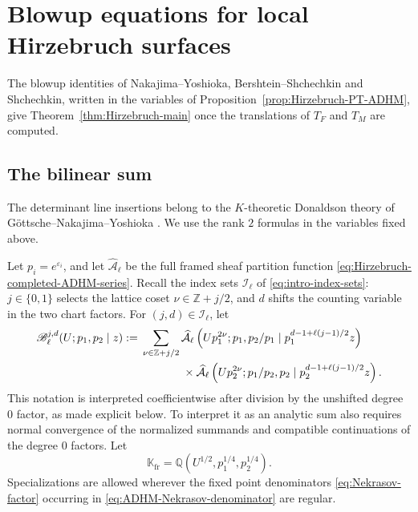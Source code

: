 \documentclass{amsart}
\theoremstyle{definition}
\numberwithin{equation}{section}
\newcommand{\Q}{\mathbb Q}
\newcommand{\Z}{\mathbb Z}
\newcommand{\K}{\mathbb K}
\newcommand{\eps}{\varepsilon}
\begin{document}
\section{Blowup equations for local Hirzebruch surfaces}
\label{sec:NY}

The blowup identities of Nakajima--Yoshioka, Bershtein--Shchechkin and Shchechkin, written in the variables of Proposition~\ref{prop:Hirzebruch-PT-ADHM}, give Theorem~\ref{thm:Hirzebruch-main} once the translations of \(T_F\) and \(T_M\) are computed.

\subsection{The bilinear sum}
The determinant line insertions belong to the \(K\)-theoretic Donaldson theory of G\"ottsche--Nakajima--Yoshioka \cite{GottscheNakajimaYoshioka}.  We use the rank \(2\) formulas in the variables fixed above.

Let \(p_i=e^{\eps_i}\), and let \(\widehat{\mathcal A}_\ell\) be the full framed sheaf partition function \eqref{eq:Hirzebruch-completed-ADHM-series}.  Recall the index sets \(\mathcal I_\ell\) of \eqref{eq:intro-index-sets}: \(j\in\{0,1\}\) selects the lattice coset \(\nu\in\Z+j/2\), and \(d\) shifts the counting variable in the two chart factors.  For \((j,d)\in\mathcal I_\ell\), let
\begin{equation}
\begin{aligned}
 \mathscr B_{\ell}^{j,d}(U;p_1,p_2\mid z)
 :={}&\sum_{\nu\in\Z+j/2}
 \widehat{\mathcal A}_\ell
 \left(Up_1^{2\nu};p_1,p_2/p_1
       \mid p_1^{d-1+\ell(j-1)/2}z\right)\\
 &\hspace{13mm}\times
 \widehat{\mathcal A}_\ell
 \left(Up_2^{2\nu};p_1/p_2,p_2
       \mid p_2^{d-1+\ell(j-1)/2}z\right).
\end{aligned}
\label{eq:finite-NY-bilinear-operator}
\end{equation}
This notation is interpreted coefficientwise after division by the unshifted degree \(0\) factor, as made explicit below.  To interpret it as an analytic sum also requires normal convergence of the normalized summands and compatible continuations of the degree \(0\) factors.  Let
\[
 \K_{\mathrm{fr}}
 =\Q(U^{1/2},p_1^{1/4},p_2^{1/4}).
\]
Specializations are allowed wherever the fixed point denominators \eqref{eq:Nekrasov-factor} occurring in \eqref{eq:ADHM-Nekrasov-denominator} are regular.
\end{document}
